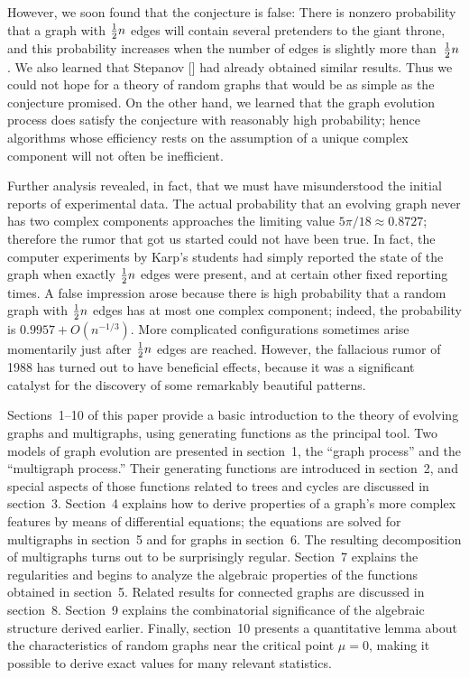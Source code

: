 However, we soon found that the conjecture is false: There is
nonzero probability that a graph 
with ${1\over2} n$ edges will contain several pretenders to the giant throne,
and this probability increases when the number of edges is slightly more
than~${1\over2} n$.
We also learned that Stepanov [\Sii] had already obtained similar results.
Thus we could not hope for a theory of random graphs that would be as simple
as the conjecture promised. On the other hand, we learned that
the graph evolution process does satisfy the conjecture with reasonably
high probability; hence algorithms
whose efficiency rests on the assumption of a unique complex component will
not often be inefficient.

Further analysis revealed, in fact, that we must have misunderstood
the initial reports of experimental data. The actual probability that
an evolving graph never has two complex components approaches the limiting
value $5\pi/18\approx 0.8727$; therefore the rumor that got us started could
not have been true. In fact, the computer experiments by Karp's students had
simply reported the state of the graph when exactly ${1\over2} n$
edges were present, and at certain other fixed reporting times. A false
impression arose because there is high probability that a random graph with ${1\over2} n$
edges has at most one
complex component; indeed, the probability is $0.9957+O(n^{-1/3})$. More
complicated configurations sometimes arise momentarily just after ${1\over2} n$
edges are reached. However, the fallacious rumor of 1988 has turned
out to have beneficial effects, because it was a significant catalyst
for the discovery of some remarkably beautiful patterns.

Sections~1--10 of this paper provide a basic introduction to the theory of
evolving graphs and multigraphs, using generating functions as the principal
tool. Two models of graph evolution are presented in section~1, the
``graph process'' and the ``multigraph process.'' Their generating functions
are introduced in section~2, and special aspects of those functions related
to trees and cycles are discussed in section~3. Section~4 explains how to
derive properties of a graph's more complex features by means of
differential equations; the equations are solved for multigraphs in section~5
and for graphs in section~6. The resulting decomposition of multigraphs
turns out to be surprisingly regular. Section~7 explains the regularities and
begins to analyze the algebraic properties of the functions obtained in
section~5. Related results for connected graphs are discussed in section~8.
Section~9 explains the combinatorial significance of the algebraic
structure derived earlier. Finally, section~10 presents a quantitative
lemma about the characteristics of random graphs near the critical
point $\mu=0$, making it possible to derive exact values for many
relevant statistics.

